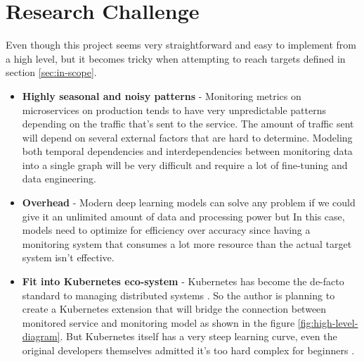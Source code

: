 
{\let\clearpage\relax\chapter{Research Challenge}}

Even though this project seems very straightforward and easy to implement from a high level, but it becomes tricky when attempting to reach targets defined in section \ref{sec:in-scope}.
\\
\begin{itemize}[leftmargin=*] 
\item \textbf{Highly seasonal and noisy patterns} - Monitoring metrics on microservices on production tends to have very unpredictable patterns depending on the traffic that's sent to the service. The amount of traffic sent will depend on several external factors that are hard to determine. Modeling both temporal dependencies and interdependencies between monitoring data into a single graph will be very difficult and require a lot of fine-tuning and data engineering.
\item \textbf{Overhead} - Modern deep learning models can solve any problem if we could give it an unlimited amount of data and processing power but In this case, models need to optimize for efficiency over accuracy since having a monitoring system that consumes a lot more resource than the actual target system isn't effective.
\item \textbf{Fit into Kubernetes eco-system} - Kubernetes has become the de-facto standard to managing distributed systems \citep{WhatisCo78:online}. So the author is planning to create a Kubernetes extension that will bridge the connection between monitored service and monitoring model as shown in the figure \ref{fig:high-level-diagram}. But Kubernetes itself has a very steep learning curve, even the original developers themselves admitted it's too hard complex for beginners \cite{Googlead4:online}.
\end{itemize}
